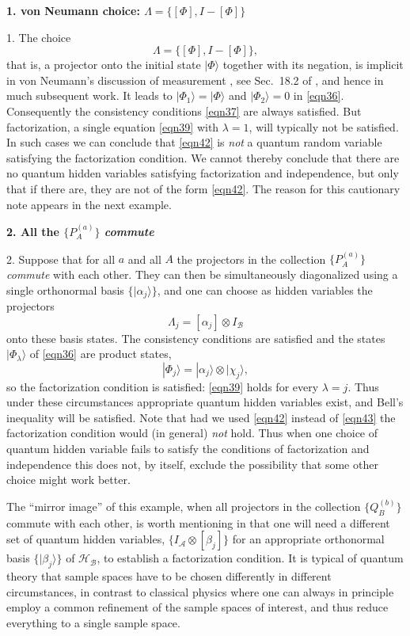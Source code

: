 \documentclass[12pt]{article} %
\def\outl#1{\par{\medskip\noindent\hspace*{.5cm}\bf
      \mathversion{bold}#1\mathversion{normal}\smallskip} }
\def\np{} \def\xa{} \def\xb{} \def\xn{} \def\xp{}
\def\outl#1{} \def\np{} \def\xa{} \def\xb{} \def\xn{} \def\xp{}
\def\outl#1{\par{\medskip\noindent\hspace*{.5cm}\bf
      \mathversion{bold}#1\mathversion{normal}\smallskip} }
\def\np{\newpage }\def\xn{\nopagebreak }\def\xp{\pagebreak }
\newcommand{\ket}[1]{|#1\rgl }
\newcommand{\ot}{\otimes }
\newcommand{\rgl}{\rangle }
\newcommand{\AM}{{\mathcal A}}
\newcommand{\BM}{{\mathcal B}}
\newcommand{\HM}{{\mathcal H}}
\newcommand{\al}{\alpha }
\newcommand{\bt}{\beta }
\newcommand{\lm}{\lambda }
\newcommand{\Lm}{\Lambda }
\begin{document}
\xb
\outl{1. von Neumann choice: $\Lm = \{[\Phi], I-[\Phi] \}$ }
\xa


1. The choice 
\begin{equation}
  \Lm = \{[\Phi], I-[\Phi] \},
\label{eqn42}
\end{equation}
that is, a projector onto the initial state $\ket{\Phi}$ together with its
negation, is implicit in von Neumann's discussion of measurement
\cite{vNmn55}, see Sec.~18.2 of \cite{Grff02c}, and hence in much subsequent
work. It leads to $\ket{\Phi_1}= \ket{\Phi}$ and $\ket{\Phi_2} = 0$ in
\eqref{eqn36}.  Consequently the consistency conditions \eqref{eqn37} are
always satisfied. But factorization, a single equation \eqref{eqn39} with
$\lm=1$, will typically not be satisfied.  In such cases we can conclude that
\eqref{eqn42} is \emph{not} a quantum random variable satisfying the
factorization condition.  We cannot thereby conclude that there are no quantum
hidden variables satisfying factorization and independence, but only that if
there are, they are not of the form \eqref{eqn42}.  The reason for this
cautionary note appears in the next example.

\xb
\outl{2. All the $\{P^{(a)}_A\}$ \emph{commute}}
\xa


2. Suppose that for all $a$ and all $A$ the projectors in the collection
$\{P^{(a)}_A\}$ \emph{commute} with each other.  They can then be
simultaneously diagonalized using a single orthonormal basis
$\{\ket{\al_j}\}$, and one can choose as hidden variables the projectors
\begin{equation}
  \Lm_j = [\al_j] \ot I_\BM
\label{eqn43}
\end{equation}
onto these basis states.  The consistency conditions are satisfied and the
states $\ket{\Phi_\lm}$ of \eqref{eqn36} are product states,
\begin{equation}
  \ket{\Phi_j} = \ket{\al_j}\ot\ket{\chi_j},
\label{eqn44}
\end{equation}
so the factorization condition is satisfied: \eqref{eqn39} holds
for every $\lm=j$.  Thus under these circumstances appropriate
quantum hidden variables exist, and Bell's inequality will be satisfied.  Note
that had we used \eqref{eqn42} instead of \eqref{eqn43} the factorization
condition would (in general) \emph{not} hold.  Thus when one choice
of quantum hidden variable fails to satisfy the conditions of factorization
and independence this does not, by itself, exclude the possibility that some
other choice might work better.

The ``mirror image'' of this example, when all projectors in the collection
$\{Q^{(b)}_B\}$ commute with each other, is worth mentioning in that one will
need a different set of quantum hidden variables, $\{I_\AM\ot[\bt_j]\}$
for an appropriate orthonormal basis $\{\ket{\bt_j}\}$ of $\HM_\BM$, to
establish a factorization condition. It is typical of quantum theory that
sample spaces have to be chosen differently in different circumstances, in
contrast to classical physics where one can always in principle employ a
common refinement of the sample spaces of interest, and thus reduce everything
to a single sample space. 
\end{document}
